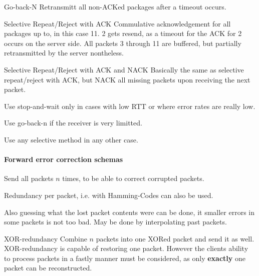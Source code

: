 \documentclass[english]{panikzettel}
\begin{document}
	\begin{thirdboxl}
		\vspace{-\baselineskip}
		\begin{defi}{Go-back-N}
			Retransmitt all non-ACKed packages after a timeout occurs.
		\end{defi}
	\end{thirdboxl}
	\begin{thirdboxm}
		\vspace{-\baselineskip}
		\begin{defi}{Selective Repeat/Reject with ACK}
			Commulative acknowledgement for all packages up to, in this case 11. 2 gets resend, as a timeout for the ACK for 2 occurs on the server side. All packets 3 through 11 are buffered, but partially retransmitted by the server nontheless.
		\end{defi}
	\end{thirdboxm}
	\begin{thirdboxr}
		\vspace{-\baselineskip}
		\begin{defi}{Selective Repeat/Reject with ACK and NACK}
			Basically the same as selective repeat/reject with ACK, but NACK all missing packets upon receiving the next packet.
		\end{defi}
	\end{thirdboxr}

	Use stop-and-wait only in cases with low RTT or where error rates are really low.

	Use go-back-n if the receiver is very limitted.

	Use any selective method in any other case.

	\paragraph{Forward error correction schemas}
	\label{pgf-forward-error-correction-schemas}
	
	Send all packets \( n \) times, to be able to correct corrupted packets. 

	Redundancy per packet, i.e. with Hamming-Codes can also be used.

	Also guessing what the lost packet contents were can be done, it smaller errors in some packets is not too bad. May be done by interpolating past packets.

	\begin{defi}{XOR-redundancy}
		Combine \( n \) packets into one XORed packet and send it as well.
		XOR-redundancy is capable of restoring one packet.
		However the clients ability to process packets in a fastly manner must be considered, as only \textbf{exactly} one packet can be reconstructed.
	\end{defi}
\end{document}
